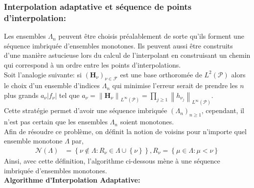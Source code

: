 \newpage
\subsubsection{Interpolation adaptative et séquence de points d'interpolation:}

\hspace{0.5cm}
Les ensembles $\Lambda_n$ peuvent être choisis préalablement de sorte qu'ils forment une séquence imbriquée d'ensembles monotones. Ils peuvent aussi être construits d'une manière astucieuse lors du calcul de l'interpolant en construisant un chemin qui correspond à un ordre entre les points d'interpolations. \\

Soit l'analogie suivante: si $(\textbf{H}_{\nu})_{\nu \in \mathcal{F}}$ est une base orthoromée de $L^2(\mathcal{P})$ alors le choix d'un ensemble d'indices $\Lambda_n$ qui minimise l'erreur serait de prendre les $n$ plus grands $a_{\nu} \left | f_{\nu} \right |$ tel que $a_{\nu} = \left \| \textbf{H}_{\nu} \right \|_{L^{\infty}(\mathcal{P})} = \prod_{j \geq 1} \left \| {h_{\nu_j}} \right \|_{L^{\infty}(\mathcal{P})}$. \\
Cette stratégie permet d'avoir une séquence imbriquée $(\Lambda_n)_{n \geq 1}$, cependant, il n'est pas certain que les ensembles $\Lambda_n$ soient monotones. \\
Afin de résoudre ce problème, on définit la notion de voisins pour n'importe quel ensemble monotone $\Lambda$ par,
\begin{align}
	 \mathcal{N}(\Lambda) & = \left \{ \nu \notin \Lambda : R_{\nu} \in \Lambda \cup \left \{ \nu \right \} \right \}, R_{\nu} = \left \{ \mu \in \Lambda : \mu < \nu \right \} \nonumber
\end{align}
Ainsi, avec cette définition, l'algorithme ci-dessous mène à une séquence imbriquée d'ensembles monotones. \\

\textbf{Algorithme d'Interpolation Adaptative:}

\vspace{0.5cm}

